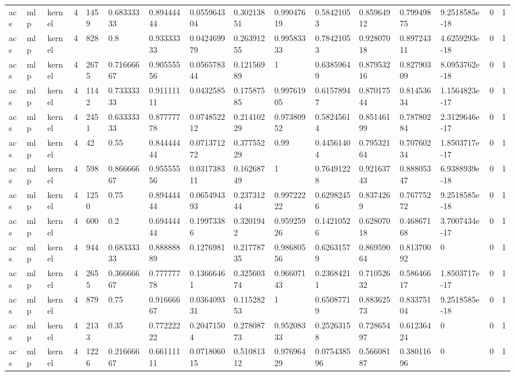 \begin{tabular}{llllllllllllllll}
acs & mlp & kernel & 4 & 1459 & 0.68333333 & 0.89444444 & 0.055964304 & 0.30213851 & 0.99047619 & 0.58421053 & 0.85964912 & 0.79949875 & 9.2518585e-18 & 0 & 1 \\
acs & mlp & kernel & 4 & 828 & 0.8 & 0.93333333 & 0.042469979 & 0.26391255 & 0.99583333 & 0.78421053 & 0.92807018 & 0.89724311 & 4.6259293e-18 & 0 & 1 \\
acs & mlp & kernel & 4 & 2675 & 0.71666667 & 0.90555556 & 0.056578344 & 0.12156989 & 1 & 0.63859649 & 0.87953216 & 0.82790309 & 8.0953762e-18 & 0 & 1 \\
acs & mlp & kernel & 4 & 1142 & 0.73333333 & 0.91111111 & 0.0432585 & 0.17587585 & 0.99761905 & 0.61578947 & 0.87017544 & 0.81453634 & 1.1564823e-17 & 0 & 1 \\
acs & mlp & kernel & 4 & 2451 & 0.63333333 & 0.87777778 & 0.074852212 & 0.21410229 & 0.97380952 & 0.58245614 & 0.85146199 & 0.78780284 & 2.3129646e-17 & 0 & 1 \\
acs & mlp & kernel & 4 & 42 & 0.55 & 0.84444444 & 0.071371272 & 0.37755229 & 0.99 & 0.44561404 & 0.79532164 & 0.70760234 & 1.8503717e-17 & 0 & 1 \\
acs & mlp & kernel & 4 & 598 & 0.86666667 & 0.95555556 & 0.031738311 & 0.16268749 & 1 & 0.76491228 & 0.92163743 & 0.88805347 & 6.9388939e-18 & 0 & 1 \\
acs & mlp & kernel & 4 & 1250 & 0.75 & 0.89444444 & 0.065494393 & 0.23731244 & 0.99722222 & 0.62982456 & 0.8374269 & 0.76775272 & 9.2518585e-18 & 0 & 1 \\
acs & mlp & kernel & 4 & 600 & 0.2 & 0.69444444 & 0.19973386 & 0.3201942 & 0.95925926 & 0.14210526 & 0.62807018 & 0.46867168 & 3.7007434e-17 & 0 & 1 \\
acs & mlp & kernel & 4 & 944 & 0.68333333 & 0.88888889 & 0.1276981 & 0.21778735 & 0.98680556 & 0.62631579 & 0.86959064 & 0.81370092 & 0 & 0 & 1 \\
acs & mlp & kernel & 4 & 2655 & 0.36666667 & 0.77777778 & 0.13666461 & 0.32560374 & 0.96607143 & 0.23684211 & 0.71052632 & 0.58646617 & 1.8503717e-17 & 0 & 1 \\
acs & mlp & kernel & 4 & 879 & 0.75 & 0.91666667 & 0.036409331 & 0.11528253 & 1 & 0.65087719 & 0.88362573 & 0.83375104 & 9.2518585e-18 & 0 & 1 \\
acs & mlp & kernel & 4 & 2133 & 0.35 & 0.77222222 & 0.20471504 & 0.27808773 & 0.95208333 & 0.25263158 & 0.72865497 & 0.61236424 & 0 & 0 & 1 \\
acs & mlp & kernel & 4 & 1226 & 0.21666667 & 0.66111111 & 0.071806015 & 0.51081312 & 0.97696429 & 0.075438596 & 0.56608187 & 0.38011696 & 0 & 0 & 1 \\

\end{tabular}
